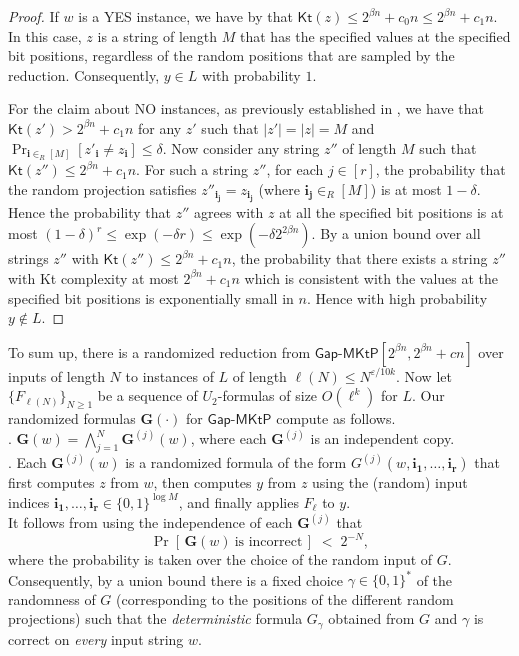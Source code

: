 \documentclass{toc}
\newcommand{\gapmktp}{\mathsf{Gap}$-$\mathsf{MKtP}}
\newcommand{\Kt}{\mathsf{Kt}}
\begin{document}
\begin{proof}
If $w$ is a YES instance, we have by  that $\Kt(z) \leq 2^{\beta n} + c_0n \leq 2^{\beta n} + c_1 n$. In this case, $z$ is a string of length $M$ that has the specified values at the specified bit positions, regardless of the random positions that are sampled by the reduction. Consequently, $y \in L$ with probability $1$.

For the claim about NO instances, as previously established in , we have that $\Kt(z') > 2^{\beta n} + c_1 n$ for any $z'$ such that $|z'| = |z| = M$ and $\Pr_{{\bm i} \in_R [M]}[z'_{\bm i} \neq z_{\bm i}] \leq \delta$. Now consider any string $z''$ of length $M$ such that $\Kt(z'') \leq 2^{\beta n} + c_1 n$. For such a string $z''$, for each $j \in [r]$, the probability that the random projection satisfies $z''_{\bm{i_j}} = z_{ \bm{i_j}}$ (where ${\bm{i_j}} \in_R [M]$) is at most $1-\delta$. Hence the probability that $z''$ agrees with $z$ at all the specified bit positions is at most $(1-\delta)^r \leq \exp(-\delta r) \leq \exp(-\delta 2^{2\beta n})$. By a union bound over all strings $z''$ with $\Kt(z'') \leq 2^{\beta n} + c_1n$, the probability that there exists a string $z''$ with Kt complexity at most $2^{\beta n} + c_1n$ which is consistent with the values at the specified bit positions is exponentially small in $n$. Hence with high probability $y \notin L$.
\end{proof}

To sum up, there is a randomized reduction from $\gapmktp[2^{\beta n},2^{\beta n} + cn ]$ over inputs of length $N$ to instances of $L$ of length $\ell(N) \leq N^{\varepsilon/10k}$. Now let $\{F_{\ell(N)}\}_{N \geq 1}$ be a sequence of $U_2$-formulas of size $O(\ell^k)$ for $L$. Our randomized formulas $\bm{G}(\cdot)$ for $\gapmktp$ compute as follows.\\

. $\bm{G}(w) = \bigwedge_{j = 1}^N \bm{G}^{(j)}(w)$, where each $\bm{G}^{(j)}$ is an independent copy.\\

. Each $\bm{G}^{(j)}(w)$ is a randomized formula of the form $G^{(j)}(w, \bm{i_1}, \ldots, \bm{i_r})$ that first computes $z$ from $w$, then computes $y$ from $z$ using the (random) input indices $\bm{i_1}, \ldots, \bm{i_r} \in \{0,1\}^{\log M}$, and finally applies $F_\ell$ to $y$.\\

It follows from  using the independence of each $\bm{G}^{(j)}$ that $$\Pr[\,\bm{G}(w)~\text{is incorrect}\,] \;<\; 2^{-N},$$ where the probability is taken over the choice of the random input of $G$. Consequently, by a union bound there is a fixed choice $\gamma \in \{0,1\}^*$ of the randomness of $G$ (corresponding to the positions of the different random projections) such that the \emph{deterministic} formula $G_\gamma$ obtained from $G$ and $\gamma$ is correct on \emph{every} input string $w$.
\end{document}
